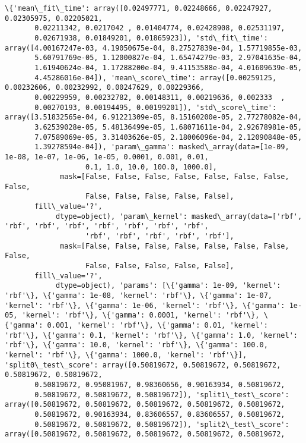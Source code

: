 \documentclass[11pt]{article}
\begin{document}
    \begin{Verbatim}[commandchars=\\\{\}]
\{'mean\_fit\_time': array([0.02497771, 0.02248666, 0.02247927, 0.02305975, 0.02205021,
       0.02211342, 0.0217042 , 0.01404774, 0.02428908, 0.02531197,
       0.02671938, 0.01849201, 0.01865923]), 'std\_fit\_time': array([4.00167247e-03, 4.19050675e-04, 8.27527839e-04, 1.57719855e-03,
       5.60791769e-05, 1.12000827e-04, 1.65474279e-03, 2.97041635e-04,
       1.61940624e-04, 1.17288200e-04, 9.41153588e-04, 4.01609639e-05,
       4.45286016e-04]), 'mean\_score\_time': array([0.00259125, 0.00232606, 0.00232992, 0.00247629, 0.00229366,
       0.00229959, 0.00232782, 0.00148311, 0.00219636, 0.002333  ,
       0.00270193, 0.00194495, 0.00199201]), 'std\_score\_time': array([3.51832565e-04, 6.91221309e-05, 8.15160200e-05, 2.77278082e-04,
       3.62539028e-05, 5.48136499e-05, 1.68071611e-04, 2.92678981e-05,
       7.07589069e-05, 3.31403626e-05, 2.18006096e-04, 2.12090848e-05,
       1.39278594e-04]), 'param\_gamma': masked\_array(data=[1e-09, 1e-08, 1e-07, 1e-06, 1e-05, 0.0001, 0.001, 0.01,
                   0.1, 1.0, 10.0, 100.0, 1000.0],
             mask=[False, False, False, False, False, False, False, False,
                   False, False, False, False, False],
       fill\_value='?',
            dtype=object), 'param\_kernel': masked\_array(data=['rbf', 'rbf', 'rbf', 'rbf', 'rbf', 'rbf', 'rbf', 'rbf',
                   'rbf', 'rbf', 'rbf', 'rbf', 'rbf'],
             mask=[False, False, False, False, False, False, False, False,
                   False, False, False, False, False],
       fill\_value='?',
            dtype=object), 'params': [\{'gamma': 1e-09, 'kernel': 'rbf'\}, \{'gamma': 1e-08, 'kernel': 'rbf'\}, \{'gamma': 1e-07, 'kernel': 'rbf'\}, \{'gamma': 1e-06, 'kernel': 'rbf'\}, \{'gamma': 1e-05, 'kernel': 'rbf'\}, \{'gamma': 0.0001, 'kernel': 'rbf'\}, \{'gamma': 0.001, 'kernel': 'rbf'\}, \{'gamma': 0.01, 'kernel': 'rbf'\}, \{'gamma': 0.1, 'kernel': 'rbf'\}, \{'gamma': 1.0, 'kernel': 'rbf'\}, \{'gamma': 10.0, 'kernel': 'rbf'\}, \{'gamma': 100.0, 'kernel': 'rbf'\}, \{'gamma': 1000.0, 'kernel': 'rbf'\}], 'split0\_test\_score': array([0.50819672, 0.50819672, 0.50819672, 0.50819672, 0.50819672,
       0.50819672, 0.95081967, 0.98360656, 0.90163934, 0.50819672,
       0.50819672, 0.50819672, 0.50819672]), 'split1\_test\_score': array([0.50819672, 0.50819672, 0.50819672, 0.50819672, 0.50819672,
       0.50819672, 0.90163934, 0.83606557, 0.83606557, 0.50819672,
       0.50819672, 0.50819672, 0.50819672]), 'split2\_test\_score': array([0.50819672, 0.50819672, 0.50819672, 0.50819672, 0.50819672,

\end{Verbatim}
\end{document}
